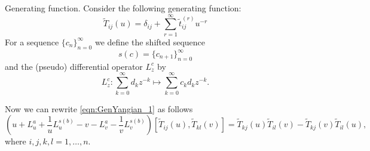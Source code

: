 \documentclass[10pt]{article}%
\numberwithin{equation}{section}
\newtheorem{rem}[thm]{Remark}
\newcommand{\red}{\color{red}}
\def\suml{\sum\limits}
\begin{document}
\begin{paragraph}{Generating function.}
Consider the following generating function:
\[
\tilde{T}_{ij}(u)=\delta_{ij}+\sum\limits_{r=1}^{\infty}\tilde{t}^{(r)}_{ij} u^{-r}
\]
For a sequence $\{c_n\}_{n=0}^{\infty}$ we define 
the shifted sequence 
\[
s(c)=\{c_{n+1}\}_{n=0}^{\infty}
\]
and the (pseudo) differential operator $L_z^c$ by
\[
L^c_z:\suml_{k=0}^{\infty} d_k z^{-k}\mapsto \suml_{k=0}^{\infty} c_k d_k z^{-k}.
\]

Now we can rewrite \eqref{eqn:GenYangian_1} as follows
\begin{equation}\label{eqn:GenYangian_2}
\left(u+L^a_u+\frac{1}{u}L^{s(b)}_u-v-L^a_v-\frac{1}{v}L^{s(b)}_v\right)[\tilde{T}_{ij}(u),\tilde{T}_{kl}(v)]=\tilde{T}_{kj}(u)\tilde{T}_{il}(v)-\tilde{T}_{kj}(v)\tilde{T}_{il}(u),
\end{equation}
where $i,j,k,l=1,\ldots,n$.




\end{paragraph}
\end{document}
